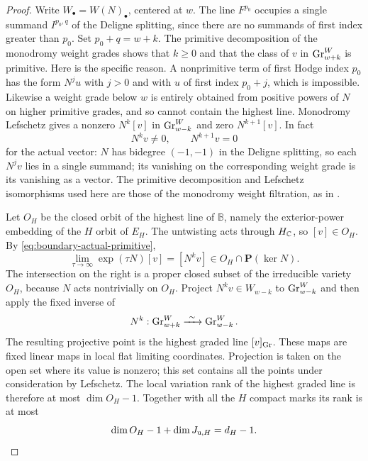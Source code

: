 \begin{proof}
Write $W_\bullet=W(N)_\bullet$, centered at $w$.  The line
$F^{p_0}$ occupies a single summand $I^{p_0,q}$ of the Deligne
splitting, since there are no summands of first index greater
than $p_0$.  Set $p_0+q=w+k$.  The primitive decomposition of
the monodromy weight grades shows that $k\geq0$ and that the
class of $v$ in $\operatorname{Gr}^W_{w+k}$ is primitive.  Here is the
specific reason.  A nonprimitive term of first Hodge index
$p_0$ has the form $N^j u$ with $j>0$ and with $u$ of first
index $p_0+j$, which is impossible.  Likewise a weight grade
below $w$ is entirely obtained from positive powers of $N$
on higher primitive grades, and so cannot contain the highest
line.  Monodromy Lefschetz gives a nonzero $N^k[v]$ in
$\operatorname{Gr}^W_{w-k}$ and zero $N^{k+1}[v]$.  In fact
\begin{equation}\label{eq:boundary-actual-primitive}
                         N^kv\ne0,\qquad N^{k+1}v=0
\end{equation}
for the actual vector: $N$ has bidegree $(-1,-1)$ in the
Deligne splitting, so each $N^jv$ lies in a single summand;
its vanishing on the corresponding weight grade is its
vanishing as a vector.  The primitive decomposition and
Lefschetz isomorphisms used here are those of the monodromy
weight filtration, as in \cite[Lemma~6.4 and Theorem~6.16]{Schmid}.

Let $O_H$ be the closed orbit of the highest line of
$\mathbb B$, namely the exterior-power embedding of the
$H$ orbit of $E_H$.  The untwisting acts through $H_{\mathbb C}$,
so $[v]\in O_H$.  By \eqref{eq:boundary-actual-primitive},
\[
             \lim_{\tau\to\infty}\exp(\tau N)[v]=[N^kv]
                         \in O_H\cap\mathbf P(\ker N).
\]
The intersection on the right is a proper closed subset of
the irreducible variety $O_H$, because $N$ acts nontrivially
on $O_H$.  Project $N^kv\in W_{w-k}$ to $\operatorname{Gr}^W_{w-k}$ and
then apply the fixed inverse of
\[
                N^k:\operatorname{Gr}^W_{w+k}\xrightarrow{\ \sim\ }
                                      \operatorname{Gr}^W_{w-k}.
\]
The resulting projective point is the highest graded line
$[v]_{\operatorname{Gr}}$.  These maps are fixed linear maps in local flat
limiting coordinates.  Projection is taken on the open set
where its value is nonzero; this set contains all the points
under consideration by Lefschetz.  The local variation rank
of the highest graded line is therefore at most
$\dim O_H-1$.  Together with all the $H$ compact marks its
rank is at most
\begin{equation}\label{eq:boundary-graded-rank}
                    \dim O_H-1+\dim J_{{\rm u},H}=d_H-1.
\end{equation}


\end{proof}
